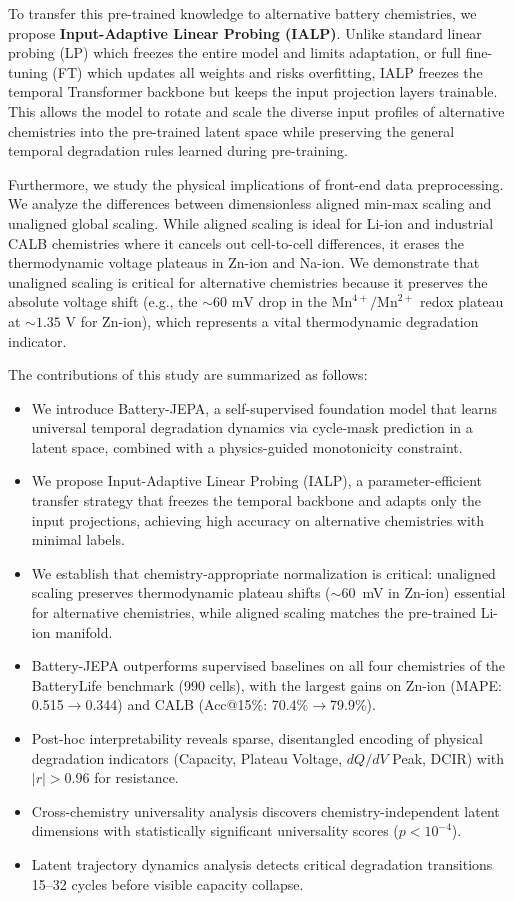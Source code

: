 \documentclass[a4paper,fleqn]{cas-dc}
\begin{document}
To transfer this pre-trained knowledge to alternative battery chemistries, we propose \textbf{Input-Adaptive Linear Probing (IALP)}. Unlike standard linear probing (LP) which freezes the entire model and limits adaptation, or full fine-tuning (FT) which updates all weights and risks overfitting, IALP freezes the temporal Transformer backbone but keeps the input projection layers trainable. This allows the model to rotate and scale the diverse input profiles of alternative chemistries into the pre-trained latent space while preserving the general temporal degradation rules learned during pre-training.

Furthermore, we study the physical implications of front-end data preprocessing. We analyze the differences between dimensionless aligned min-max scaling and unaligned global scaling. While aligned scaling is ideal for Li-ion and industrial CALB chemistries where it cancels out cell-to-cell differences, it erases the thermodynamic voltage plateaus in Zn-ion and Na-ion. We demonstrate that unaligned scaling is critical for alternative chemistries because it preserves the absolute voltage shift (e.g., the $\sim60\text{ mV}$ drop in the $\text{Mn}^{4+}/\text{Mn}^{2+}$ redox plateau at $\sim1.35\text{ V}$ for Zn-ion), which represents a vital thermodynamic degradation indicator.

The contributions of this study are summarized as follows:
\begin{itemize}
    \item We introduce Battery-JEPA, a self-supervised foundation model that learns universal temporal degradation dynamics via cycle-mask prediction in a latent space, combined with a physics-guided monotonicity constraint.
    \item We propose Input-Adaptive Linear Probing (IALP), a parameter-efficient transfer strategy that freezes the temporal backbone and adapts only the input projections, achieving high accuracy on alternative chemistries with minimal labels.
    \item We establish that chemistry-appropriate normalization is critical: unaligned scaling preserves thermodynamic plateau shifts ($\sim$60~mV in Zn-ion) essential for alternative chemistries, while aligned scaling matches the pre-trained Li-ion manifold.
    \item Battery-JEPA outperforms supervised baselines on all four chemistries of the BatteryLife benchmark (990 cells), with the largest gains on Zn-ion (MAPE: 0.515$\rightarrow$0.344) and CALB (Acc@15\%: 70.4\%$\rightarrow$79.9\%).
    \item Post-hoc interpretability reveals sparse, disentangled encoding of physical degradation indicators (Capacity, Plateau Voltage, $dQ/dV$ Peak, DCIR) with $|r| > 0.96$ for resistance.
    \item Cross-chemistry universality analysis discovers chemistry-independent latent dimensions with statistically significant universality scores ($p < 10^{-4}$).
    \item Latent trajectory dynamics analysis detects critical degradation transitions 15--32 cycles before visible capacity collapse.
\end{itemize}
\end{document}
